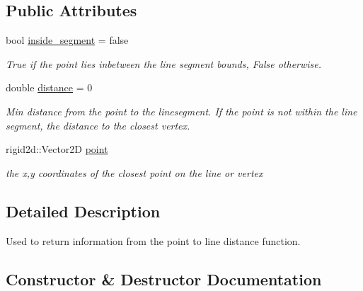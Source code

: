 \subsection*{Public Attributes}
\begin{DoxyCompactItemize}
\item 
\mbox{\label{structcollision_1_1DistRes_a9da4071fdc224d798adb12dcb1cfff58}} 
bool \hyperlink{structcollision_1_1DistRes_a9da4071fdc224d798adb12dcb1cfff58}{inside\+\_\+segment} = false
\begin{DoxyCompactList}\small\item\em True if the point lies inbetween the line segment bounds, False otherwise. \end{DoxyCompactList}\item 
\mbox{\label{structcollision_1_1DistRes_a11d43615b27de89a62ef53a2075f72ee}} 
double \hyperlink{structcollision_1_1DistRes_a11d43615b27de89a62ef53a2075f72ee}{distance} = 0
\begin{DoxyCompactList}\small\item\em Min distance from the point to the linesegment. If the point is not within the line segment, the distance to the closest vertex. \end{DoxyCompactList}\item 
\mbox{\label{structcollision_1_1DistRes_a8bbf909cdbaba53fe0a98e4f3d312131}} 
rigid2d\+::\+Vector2D \hyperlink{structcollision_1_1DistRes_a8bbf909cdbaba53fe0a98e4f3d312131}{point}
\begin{DoxyCompactList}\small\item\em the x,y coordinates of the closest point on the line or vertex \end{DoxyCompactList}\end{DoxyCompactItemize}


\subsection{Detailed Description}
Used to return information from the point to line distance function. 

\subsection{Constructor \& Destructor Documentation}
\mbox{\label{structcollision_1_1DistRes_aa410e45b30d3371699c3bc4b97293437}} 
